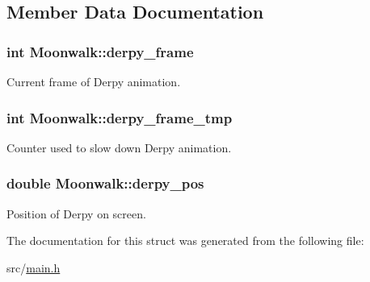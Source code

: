 \subsection{Member Data Documentation}
\hypertarget{structMoonwalk_a4a3874c58e11745d4896b004861e1555}{
\subsubsection[{derpy\-\_\-frame}]{\setlength{\rightskip}{0pt plus 5cm}int Moonwalk\-::derpy\-\_\-frame}}\label{structMoonwalk_a4a3874c58e11745d4896b004861e1555}
Current frame of Derpy animation. \hypertarget{structMoonwalk_ab087ba01cd2a107286ec8f75f58c676c}{
\subsubsection[{derpy\-\_\-frame\-\_\-tmp}]{\setlength{\rightskip}{0pt plus 5cm}int Moonwalk\-::derpy\-\_\-frame\-\_\-tmp}}\label{structMoonwalk_ab087ba01cd2a107286ec8f75f58c676c}
Counter used to slow down Derpy animation. \hypertarget{structMoonwalk_a69689c77a64928bfb52c1dc1e1f7b33f}{
\subsubsection[{derpy\-\_\-pos}]{\setlength{\rightskip}{0pt plus 5cm}double Moonwalk\-::derpy\-\_\-pos}}\label{structMoonwalk_a69689c77a64928bfb52c1dc1e1f7b33f}
Position of Derpy on screen. 

The documentation for this struct was generated from the following file\-:\begin{DoxyCompactItemize}
\item 
src/\hyperlink{main_8h}{main.\-h}\end{DoxyCompactItemize}
